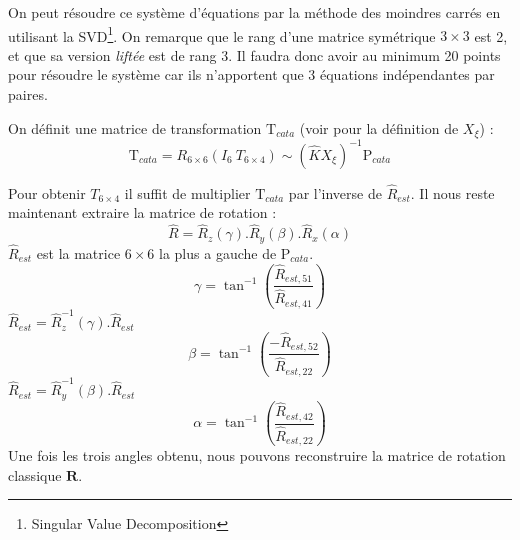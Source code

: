 On peut résoudre ce système d'équations par la méthode des moindres carrés en utilisant la SVD\footnote{Singular Value Decomposition}.
On remarque que le rang d'une matrice symétrique $3\times3$ est 2, et que sa version \emph{liftée} est de rang 3.
Il faudra donc avoir au minimum 20 points pour résoudre le système car ils n'apportent que 3 équations indépendantes par paires.


On définit une matrice de transformation $\text{T}_{cata}$ (voir \cite{Puig11PhD} pour la définition de $X_\xi$) :
\begin{equation}
\text{T}_{cata} = R_{6\times6} \left(I_6~T_{6\times4} \right) \sim (\hat{K}X_\xi )^{-1} \text{P}_{cata}
\end{equation}

Pour obtenir $T_{6\times4}$ il suffit de multiplier $\text{T}_{cata}$ par l'inverse de $\hat{R}_{est}$.
Il nous reste maintenant extraire la matrice de rotation :
\begin{equation}
\hat{R} = \hat{R}_z(\gamma).\hat{R}_y(\beta).\hat{R}_x(\alpha)
\end{equation}
$\hat{R}_{est}$ est la matrice $6\times6$ la plus a gauche de $\text{P}_{cata}$.
\begin{equation}
\gamma = \tan^{-1}\left(\frac{\hat{R}_{est,51}}{\hat{R}_{est,41}}\right)
\end{equation}
$\hat{R}_{est} = \hat{R}_z^{-1}(\gamma).\hat{R}_{est}$
\begin{equation}
\beta = \tan^{-1}\left(\frac{-\hat{R}_{est,52}}{\hat{R}_{est,22}}\right)
\end{equation}
$\hat{R}_{est} = \hat{R}_y^{-1}(\beta).\hat{R}_{est}$
\begin{equation}
\alpha = \tan^{-1}\left(\frac{\hat{R}_{est,42}}{\hat{R}_{est,22}}\right)
\end{equation}
Une fois les trois angles obtenu, nous pouvons reconstruire la matrice de rotation classique $\mathbf{R}$.

